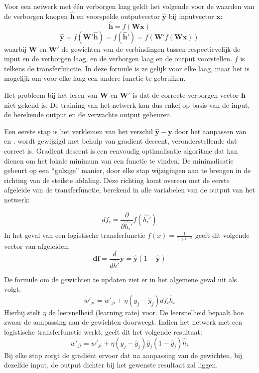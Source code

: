 Voor een netwerk met \'e\'en verborgen laag geldt het volgende voor de waarden van de verborgen knopen $\mathbf{\hat{h}}$ en voorspelde outputvector $\mathbf{\hat{y}}$ bij inputvector $\mathbf{x}$:
\begin{equation}
    \mathbf{\hat{h}} = f(\mathbf{Wx})
\end{equation}
\begin{equation}
    \boldsymbol{\hat{y}} = f(\boldsymbol{W'\hat{h}}) = f(\boldsymbol{\hat{h}'}) = f(\boldsymbol{W'}f(\boldsymbol{Wx}))
\end{equation}
waarbij $\mathbf{W}$ en $\mathbf{W'}$ de gewichten van de verbindingen tussen respectievelijk de input en de verborgen laag, en de verborgen laag en de output voorstellen. $f$ is telkens de transferfunctie. In deze formule is ze gelijk voor elke laag, maar het is mogelijk om voor elke laag een andere functie te gebruiken.

Het probleem bij het leren van $\mathbf{W}$ en $\mathbf{W'}$ is dat de correcte verborgen vector $\mathbf{h}$ niet gekend is. De training van het netwerk kan dus enkel op basis van de input, de  berekende output en de verwachte output gebeuren.

Een eerste stap is het verkleinen van het verschil $\mathbf{\hat{y}} - \mathbf{y}$ door het aanpassen van  en .  wordt gewijzigd met behulp van gradient descent, veronderstellende dat  correct is. Gradient descent is een eenvoudig optimalisatie algoritme dat kan dienen om het lokale minimum van een functie te vinden. De minimalisatie gebeurt op een ``gulzige'' manier, door elke stap wijzigingen aan te brengen in de richting van de steilste afdaling. Deze richting komt overeen met de eerste afgeleide van de transferfunctie, berekend in alle variabelen van de output van het netwerk:

\begin{equation}
df_i = \frac{\partial}{\partial\hat{h_i}'}f(\hat{h_i}')
\end{equation}
In het geval van een logistische transferfunctie $f(x) = \frac{1}{1 + \mathrm e^{-x}}$ geeft dit volgende vector van afgeleiden:
\begin{equation}
  \mathbf{df} = \frac{d}{d\hat{h}'}\mathbf{\hat{y}} = \mathbf{\hat{y}}(1-\mathbf{\hat{y}})
\end{equation}

De formule om de gewichten te updaten ziet er in het algemene geval uit als volgt:
\begin{equation}
  w'_{ji} = w'_{ji} + \eta(y_j-\hat{y}_j)df_i\hat{h}_i
\end{equation}
Hierbij stelt $\eta$ de leersnelheid (learning rate) voor. De leersnelheid bepaalt hoe zwaar de aanpassing aan de gewichten doorweegt.
Indien het netwerk met een logistische transferfunctie werkt, geeft dit het volgende resultaat:
\begin{equation}
    w'_{ji} = w'_{ji} + \eta(y_j-\hat{y}_j)\hat{y}_j(1-\hat{y}_j)\hat{h}_i
\end{equation}
Bij elke stap zorgt de gradi\"ent ervoor dat na aanpassing van de gewichten, bij dezelfde input, de output dichter bij het gewenste resultaat zal liggen.

